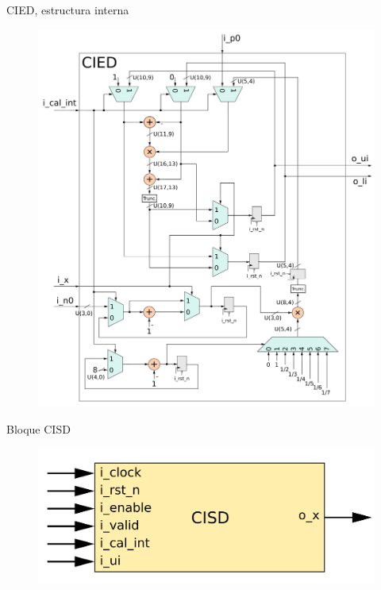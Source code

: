 \documentclass[xcolor=table]{beamer}
\begin{document}
\begin{frame}{CIED, estructura interna}

 \begin{figure}
  \centering
  \includegraphics[height=0.85\paperheight]{Diagramas/internal_cied.png}%
\end{figure}
\end{frame}


\begin{frame}{Bloque CISD}

 \begin{figure}
  \centering
  \includegraphics[width=0.70\paperwidth]{Diagramas/cisd.png}%
\end{figure}
\end{frame}
\end{document}
